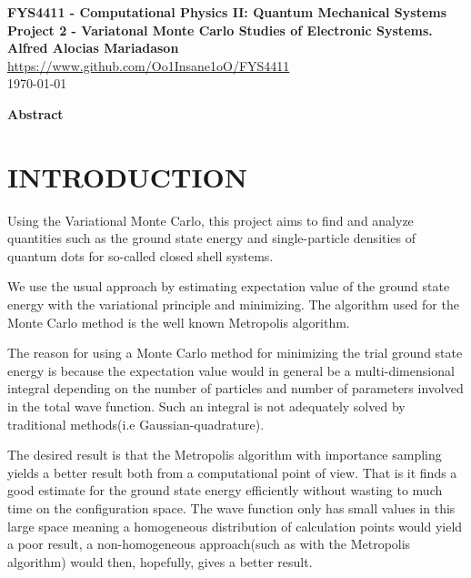 \documentclass[a4paper, hidelinks, 10pt]{article}\usepackage[utf8]{inputenc}
\newcommand{\mdate}{\today}
\newcommand{\mtitle}{FYS4411}
\newcommand{\mauthor}{Alfred Alocias Mariadason}
\newcommand{\massignn}{Project 2}
\let\oldsection\section
\renewcommand{\section}[1]{\centering \oldsection{{#1}} \justifying}
\begin{document}
\thispagestyle{empty}
\begin{center} \vspace{1cm}
    \textbf{\Large{\mtitle\hspace{0.01pt} - Computational Physics II: Quantum
    Mechanical Systems}}\\ \vspace{0.5cm}
    \textbf{\large{\massignn\hspace{0.01pt} - Variatonal Monte Carlo Studies of
    Electronic Systems.}}\\ \vspace{1cm}
    \textbf{\large{\mauthor}}\\ \vspace{0.5cm}
    \large{\url{https://www.github.com/Oo1Insane1oO/FYS4411}} \\ \vspace{0.5cm}
    \Large{\mdate}\\ \vfill
\end{center}

\clearpage
\setcounter{page}{1}

\begin{center}
    \textbf{Abstract} \\
\end{center}

\section{INTRODUCTION}
\label{sec:introduction}
    Using the Variational Monte Carlo, this project aims to find and analyze
    quantities such as the ground state energy and single-particle densities of
    quantum dots for so-called closed shell systems.

    We use the usual approach by estimating expectation value of the ground
    state energy with the variational principle and minimizing. The algorithm
    used for the Monte Carlo method is the well known Metropolis algorithm.

    The reason for using a Monte Carlo method for minimizing the trial ground
    state energy is because the expectation value would in general be a
    multi-dimensional integral depending on the number of particles and number
    of parameters involved in the total wave function. Such an integral is not
    adequately solved by traditional methods(i.e Gaussian-quadrature).

    The desired result is that the Metropolis algorithm with importance
    sampling yields a better result both from a computational point of view.
    That is it finds a good estimate for the ground state energy efficiently
    without wasting to much time on the configuration space. The wave function
    only has small values in this large space meaning a homogeneous
    distribution of calculation points would yield a poor result, a
    non-homogeneous approach(such as with the Metropolis algorithm) would then,
    hopefully, gives a better result.
\end{document}
